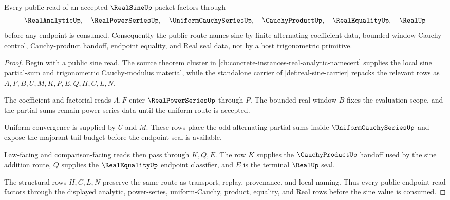 \begin{theorem}\label{thm:real-sine-power-series-route}
Every public read of an accepted $\RealSineUp$ packet factors through
$$
\RealAnalyticUp,\quad
\RealPowerSeriesUp,\quad
\UniformCauchySeriesUp,\quad
\CauchyProductUp,\quad
\RealEqualityUp,\quad
\RealUp
$$
before any endpoint is consumed. Consequently the public route names sine by finite alternating coefficient data, bounded-window Cauchy control, Cauchy-product handoff, endpoint equality, and Real seal data, not by a host trigonometric primitive.
\end{theorem}
\begin{proof}
Begin with a public sine read. The source theorem cluster in \autoref{ch:concrete-instances-real-analytic-namecert} supplies the local sine partial-sum and trigonometric Cauchy-modulus material, while the standalone carrier of \autoref{def:real-sine-carrier} repacks the relevant rows as $A,F,B,U,M,K,P,E,Q,H,C,L,N$.

The coefficient and factorial reads $A,F$ enter $\RealPowerSeriesUp$ through $P$. The bounded real window $B$ fixes the evaluation scope, and the partial sums remain power-series data until the uniform route is accepted.

Uniform convergence is supplied by $U$ and $M$. These rows place the odd alternating partial sums inside $\UniformCauchySeriesUp$ and expose the majorant tail budget before the endpoint seal is available.

Law-facing and comparison-facing reads then pass through $K,Q,E$. The row $K$ supplies the $\CauchyProductUp$ handoff used by the sine addition route, $Q$ supplies the $\RealEqualityUp$ endpoint classifier, and $E$ is the terminal $\RealUp$ seal.

The structural rows $H,C,L,N$ preserve the same route as transport, replay, provenance, and local naming. Thus every public endpoint read factors through the displayed analytic, power-series, uniform-Cauchy, product, equality, and Real rows before the sine value is consumed.
\end{proof}


